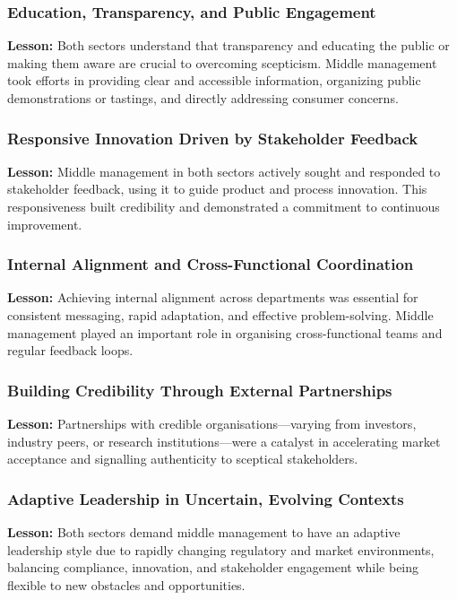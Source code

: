 \subsubsection*{Education, Transparency, and Public Engagement}
\noindent\textbf{Lesson:} Both sectors understand that transparency and educating the public or making them aware are crucial to overcoming scepticism. Middle management took efforts in providing clear and accessible information, organizing public demonstrations or tastings, and directly addressing consumer concerns.

\subsubsection*{Responsive Innovation Driven by Stakeholder Feedback}
\noindent\textbf{Lesson:} Middle management in both sectors actively sought and responded to stakeholder feedback, using it to guide product and process innovation. This responsiveness built credibility and demonstrated a commitment to continuous improvement.

\subsubsection*{Internal Alignment and Cross-Functional Coordination}
\noindent\textbf{Lesson:} Achieving internal alignment across departments was essential for consistent messaging, rapid adaptation, and effective problem-solving. Middle management played an important role in organising cross-functional teams and regular feedback loops.

\subsubsection*{Building Credibility Through External Partnerships}
\noindent\textbf{Lesson:} Partnerships with credible organisations—varying from investors, industry peers, or research institutions—were a catalyst in accelerating market acceptance and signalling authenticity to sceptical stakeholders.

\subsubsection*{Adaptive Leadership in Uncertain, Evolving Contexts}
\noindent\textbf{Lesson:} Both sectors demand middle management to have an adaptive leadership style due to rapidly changing regulatory and market environments, balancing compliance, innovation, and stakeholder engagement while being flexible to new obstacles and opportunities.

